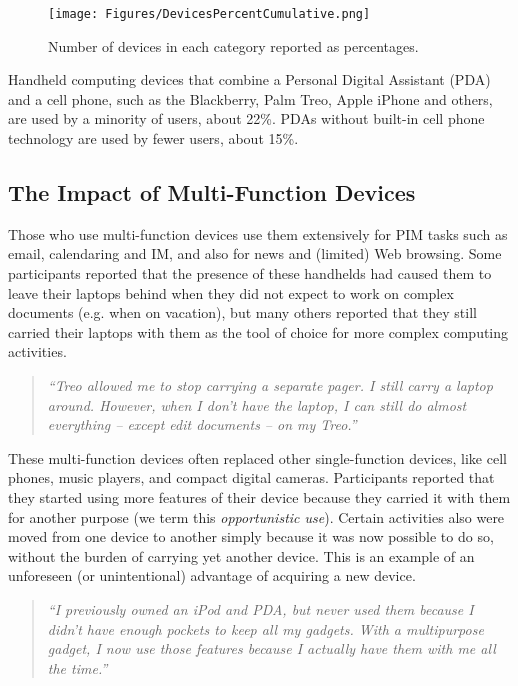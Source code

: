 \documentclass[twocolumn,final,10pt]{article}
\begin{document}
\begin{figure}[htb] 
   \centering
   \texttt{[image: Figures/DevicesPercentCumulative.png]} 
   \caption{Number of devices in each category reported as percentages.}
   \label{figure:devices-percent-cumulative}
\end{figure}   

Handheld computing devices that combine a Personal Digital Assistant (PDA) and a cell phone, such as the Blackberry, Palm Treo, Apple iPhone and others, are used by a minority of users, about 22\%. PDAs without built-in cell phone technology are used by fewer users, about 15\%.

\subsection{The Impact of Multi-Function Devices}

Those who use multi-function devices use them extensively for PIM tasks such as email, calendaring and IM, and also for news and (limited) Web browsing. Some participants reported that the presence of these handhelds had caused them to leave their laptops behind when they did not expect to work on complex documents (e.g. when on vacation), but many others reported that they still carried their laptops with them as the tool of choice for more complex computing activities.

\begin{quotation}
\textit{``Treo allowed me to stop carrying a separate pager. I still carry a laptop around.    However, when I don't have the laptop, I can still do almost everything -- except edit documents -- on my Treo.''}
\end{quotation}

These multi-function devices often replaced other sin\-gle-func\-tion devices, like cell phones, music players, and compact digital cameras. Participants reported that they started using more features of their device because they carried it with them for another purpose (we term this \textit{opportunistic use}). Certain activities also were moved from one device to another simply because it was now possible to do so, without the burden of carrying yet another device. This is an example of an unforeseen (or unintentional) advantage of acquiring a new device.

\begin{quotation}
\textit{``I previously owned an iPod and PDA, but never used them because I didn't have enough pockets to keep all my gadgets. With a multipurpose gadget, I now use those features because I actually have them with me all the time.''}
\end{quotation}
\end{document}

